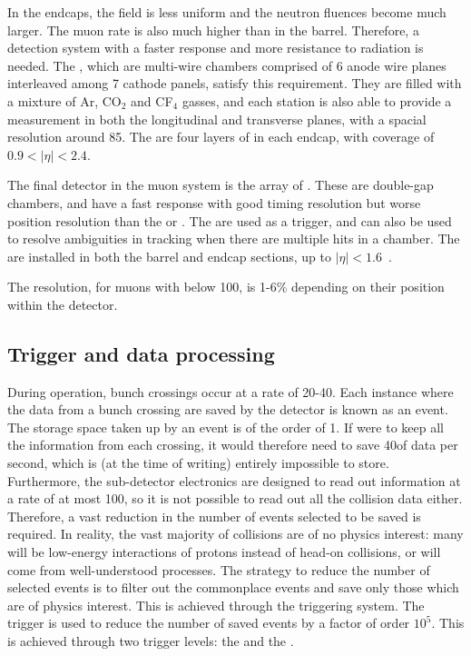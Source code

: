 In the endcaps, the field is less uniform and the neutron fluences become much larger. The muon rate is also much higher than in the barrel. Therefore, a detection system with a faster response and more resistance to radiation is needed. The \CSCs, which are multi-wire chambers comprised of 6 anode wire planes interleaved among 7 cathode panels, satisfy this requirement. They are filled with a mixture of Ar, CO$_{2}$ and CF$_{4}$ gasses, and each station is also able to provide a measurement in both the longitudinal and transverse planes, with a spacial resolution around 85\um. The are four layers of \CSCs in each endcap, with coverage of $0.9<|\eta|<2.4$.

The final detector in the muon system is the array of \RPCs. These are double-gap chambers, and have a fast response with good timing resolution but worse position resolution than the \DTs or \CSCs. The \RPCs are used as a trigger, and can also be used to resolve ambiguities in tracking when there are multiple hits in a chamber. The \RPCs are installed in both the barrel and endcap sections, up to $|\eta|<1.6$~\cite{CMSatLHC,cmsMuon}. 

The \pT resolution, for muons with \pT below 100\GeV, is 1-6\% depending on their position within the detector.~\cite{MuonReco}

\subsection{Trigger and data processing}
\label{sec:cms:trigger}

During operation, bunch crossings occur at a rate of 20-40\MHz. Each instance where the data from a bunch crossing are saved by the detector is known as an event. The storage space taken up by an event is of the order of 1\MB. If \CMS were to keep all the information from each crossing, it would therefore need to save 40\TB of data per second, which is (at the time of writing) entirely impossible to store. Furthermore, the \CMS sub-detector electronics are designed to read out information at a rate of at most 100\kHz, so it is not possible to read out all the collision data either. Therefore, a vast reduction in the number of events selected to be saved is required. In reality, the vast majority of collisions are of no physics interest: many will be low-energy interactions of protons instead of head-on collisions, or will come from well-understood \SM processes. The strategy to reduce the number of selected events is to filter out the commonplace events and save only those which are of physics interest. This is achieved through the \CMS triggering system. The trigger is used to reduce the number of saved events by a factor of order $10^5$. This is achieved through two trigger levels: the \LI and the \HLT.


